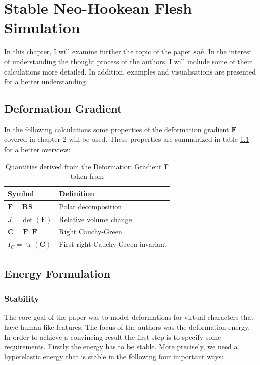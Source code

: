 \chapter{Stable Neo-Hookean Flesh Simulation} \label{c:Paper}
In this chapter, I will examine further the topic of the paper \textit{\acrshort{snh}}. In the interest of understanding the thought process of the authors, I will include some of their calculations more detailed. In addition, examples and visualisations are presented for a better understanding. 

\section{Deformation Gradient}
In the following calculations some properties of the deformation gradient $\mathbf{F}$ covered in chapter 2 will be used. These properties are summarized in table \ref{table:gradient_quantities} for a better overview:

\begin{table}[!htbp]
\centering
    \begin{tabular}{ | l | l |}
    \hline
    \textbf{Symbol} & \textbf{Definition} \\ \hline
    $\mathbf{F} = \mathbf{RS}$ & Polar decomposition \\ \hline
    $J=\operatorname{det}(\mathbf{F})$ & Relative volume change \\ \hline
    $\mathbf{C}=\mathbf{F}^\intercal \mathbf{F}$ & Right Cauchy-Green  \\ \hline	
    $I_{C}=\operatorname{tr}(\mathbf{C})$ & First right Cauchy-Green invariant \\ \hline
    \end{tabular}
    \caption{Quantities derived from the Deformation Gradient \textbf{F} taken from \cite{Smith:2018:SNF:3191713.3180491}}
\label{table:gradient_quantities}
\end{table}



\section{Energy Formulation}

\subsection{Stability}
The core goal of the paper was to model deformations for virtual characters that have human-like features. The focus of the authors was the deformation energy. In order to achieve a convincing result the first step is to specify some requirements. Firstly the energy has to be stable. More precisely, we need a hyperelastic energy that is stable in the following four important ways:

